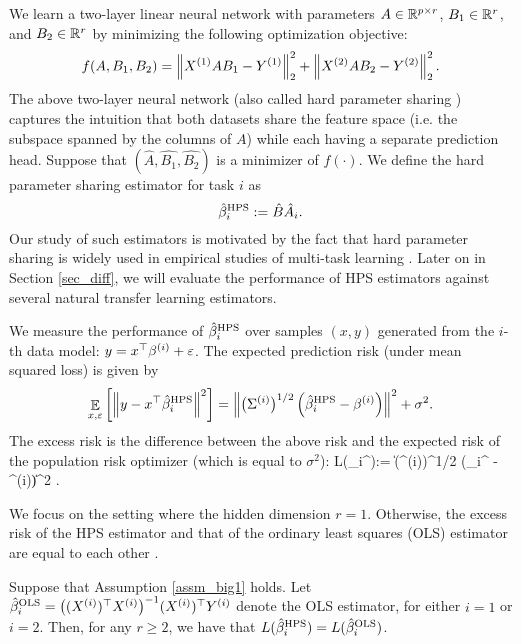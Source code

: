 We learn a two-layer linear neural network with parameters $A \in \mathbb{R}^{p\times r}$, $B_1 \in \mathbb{R}^{r}$, and $B_2 \in \mathbb{R}^r$ by minimizing the following optimization objective:
\begin{align}\label{eq_hps}
    f(A, B_1, B_2) = \left\| X^{(1)} A B_1 - Y^{(1)} \right\|_2^2 + \left\| X^{(2)} A B_2 - Y^{(2)} \right\|_2^2.
\end{align}
The above two-layer neural network (also called hard parameter sharing \cite{C97}) captures the intuition that both datasets share the feature space (i.e. the subspace spanned by the columns of $A$) while each having a separate prediction head.
Suppose that $(\hat{A}, \hat{B_1}, \hat{B_2})$ is a minimizer of $f(\cdot)$.
We define the hard parameter sharing estimator for task $i$ as
\[ \hat{\beta}_i^{\textup{HPS}} := \hat{B} \hat{A}_i. \]
Our study of such estimators is motivated by the fact that hard parameter sharing is widely used in empirical studies of multi-task learning \cite{R17}.
Later on in Section \ref{sec_diff}, we will evaluate the performance of HPS estimators against several natural transfer learning estimators.

We measure the performance of $\hat{\beta}_i^{\textup{HPS}}$ over samples $(x,y)$ generated from the $i$-th data model: $y= x^\top \beta^{(i)} + {\varepsilon}$.
The expected prediction risk (under mean squared loss) is given by
$$\mathop{\mathbb{E}}_{x, \varepsilon}\left[ \left\|y-x^\top \hat{\beta}_i^{\textup{HPS}} \right\|^2 \right]= \left\|\big(\Sigma^{(i)}\big)^{1/2} \left(\hat{\beta}_i^{\textup{HPS}} - \beta^{(i)}\right)\right\|^2 + \sigma^2.$$
The excess risk is the difference between the above risk and the expected risk of the population risk optimizer (which is equal to $\sigma^2$):
\be\label{HPS_loss}
    L(\hat{\beta}_i^{\MTL}):= \left\| \big(\Sigma^{(i)}\big)^{1/2} \left(\hat{\beta}_i^{\MTL} - \beta^{(i)}\right)\right\|^2 .
\ee

We focus on the setting where the hidden dimension $r = 1$.
Otherwise, the excess risk of the HPS estimator and that of the ordinary least squares (OLS) estimator are equal to each other \cite{WZR20}.
\begin{proposition}\label{prop_large_r}
    Suppose that Assumption \ref{assm_big1} holds.
    Let $\hat{\beta}_i^{\textup{OLS}} = \big( (X^{(i)})^{\top} X^{(i)} \big)^{-1} (X^{(i)})^{\top} Y^{(i)}$ denote the OLS estimator, for either $i = 1$ or $i = 2$.
    Then, for any $r \ge 2$, we have that $L(\hat{\beta}_i^{\textup{HPS}}) = L(\hat{\beta}_i^{\textup{OLS}})$.
\end{proposition}


